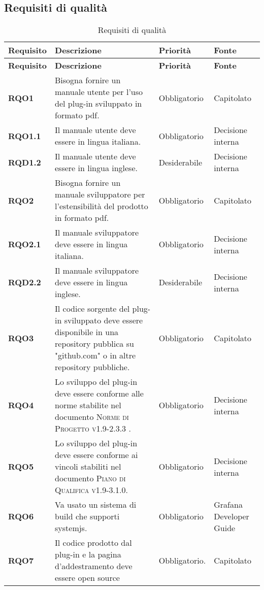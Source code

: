 \subsection{Requisiti di qualità}
\label{sub:requisiti_di_qualita}

\renewcommand{\arraystretch}{2} %
\begin{longtable}[H]{>{\centering\bfseries}m{2cm} >{\centering}m{9cm} >{\centering}m{2.5cm} >{\centering\arraybackslash}m{2.5cm}}
  \caption{Requisiti di qualità}%
  \label{tab:requisiti_di_qualità}                                                    \\
  \rowcolor{lightgray}
  {\textbf{Requisito}} & {\textbf{Descrizione}} & {\textbf{Priorità}} & {\textbf{Fonte}}  \\
  \endfirsthead%
  \rowcolor{lightgray}
  {\textbf{Requisito}} & {\textbf{Descrizione}} & {\textbf{Priorità}} & {\textbf{Fonte}}  \\
  \endhead%
  \rowcolor{white}
  \multicolumn{4}{c}{\textit{Continua alla pagina successiva}}
  \endfoot%
  \endlastfoot%
  \textbf{RQO1} & Bisogna fornire un manuale utente per l'uso del plug-in sviluppato in formato pdf. & Obbligatorio & Capitolato \\
  \textbf{RQO1.1} & Il manuale utente deve essere in lingua italiana. & Obbligatorio & Decisione interna \\
  \textbf{RQD1.2} & Il manuale utente deve essere in lingua inglese. & Desiderabile & Decisione interna \\
  \textbf{RQO2} & Bisogna fornire un manuale sviluppatore per l'estensibilità del prodotto in formato pdf. & Obbligatorio & Capitolato \\
  \textbf{RQO2.1} & Il manuale sviluppatore deve essere in lingua italiana. & Obbligatorio & Decisione interna \\
  \textbf{RQD2.2} & Il manuale sviluppatore deve essere in lingua inglese. & Desiderabile & Decisione interna \\
  \textbf{RQO3} & Il codice sorgente del plug-in sviluppato deve essere disponibile in una repository pubblica su "github.com" o in altre repository pubbliche. & Obbligatorio & Capitolato \\
  \textbf{RQO4} & Lo sviluppo del plug-in deve essere conforme alle norme stabilite nel documento \textsc{Norme di Progetto v1.9-2.3.3} . & Obbligatorio & Decisione interna \\
  \textbf{RQO5} & Lo sviluppo del plug-in deve essere conforme ai vincoli stabiliti nel documento \textsc{Piano di Qualifica v1.9-3.1.0}. & Obbligatorio & Decisione interna \\
  \textbf{RQO6} & Va usato un sistema di build che supporti systemjs. & Obbligatorio & Grafana Developer Guide \\
  \textbf{RQO7} & Il codice prodotto dal plug-in e la pagina d'addestramento deve essere open source & Obbligatorio. & Capitolato \\
\end{longtable}
